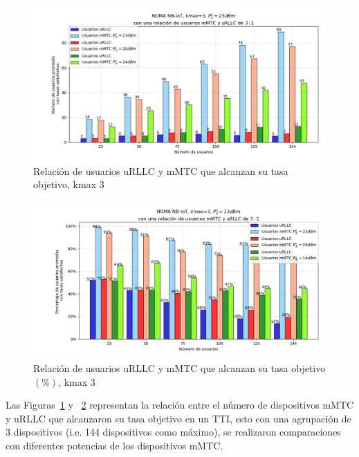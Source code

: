 \begin{figure}[th]
    \centering
    \includegraphics[scale=.65]{Figures/ResultadosNOMA/Kmax3_DiferentesPM.png}
    \decoRule
    \caption[Relación de usuarios uRLLC y mMTC que alcanzan su tasa objetivo, kmax 3]{Relación de usuarios uRLLC y mMTC que alcanzan su tasa objetivo, kmax 3}
    \label{fig:Kmax3_DiferentesPM}
\end{figure}

\begin{figure}[th]
    \centering
    \includegraphics[scale=.65]{Figures/ResultadosNOMA/Kmax3_DiferentesPM_Porcentual.png}
    \decoRule
    \caption[Relación de usuarios uRLLC y mMTC que alcanzan su tasa objetivo $(\%)$, kmax 3]{Relación de usuarios uRLLC y mMTC que alcanzan su tasa objetivo$(\%)$, kmax 3}
    \label{fig:Kmax3_DiferentesPM_Porcentual}
\end{figure}

Las Figuras~\ref{fig:Kmax3_DiferentesPM} y ~\ref{fig:Kmax3_DiferentesPM_Porcentual} representan la relación entre el número de dispositivos mMTC y uRLLC que alcanzaron su tasa objetivo en un TTI, esto con una agrupación de 3 dispositivos (i.e. 144 dispositivos como máximo), se realizaron comparaciones con diferentes potencias de los dispositivos mMTC.\newline

